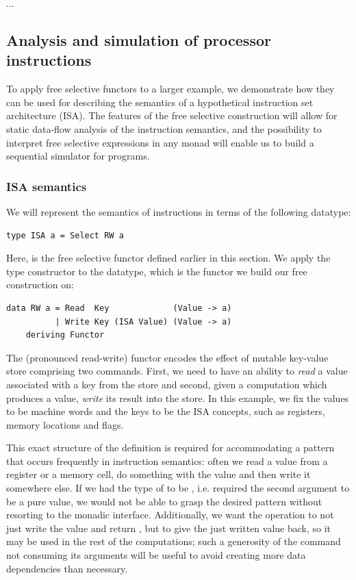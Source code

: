 ...

\subsection{Analysis and simulation of processor instructions}\label{sec-free-isa}

To apply free selective functors to a larger example, we demonstrate
how they can be used for describing the semantics of a hypothetical
instruction set architecture (ISA). The features of the free selective construction will
allow for static data-flow analysis of the instruction semantics, and the possibility
to interpret free selective expressions in any monad will enable us to build a
sequential simulator for programs.

\subsubsection{\textbf{ISA semantics}}

We will represent the semantics of instructions in terms of the following datatype:

\begin{verbatim}
type ISA a = Select RW a
\end{verbatim}

Here,  is the free selective functor defined earlier in this section.
We apply the  type constructor to the  datatype, which is the
functor we build our free construction on:

\begin{verbatim}
data RW a = Read  Key             (Value -> a)
          | Write Key (ISA Value) (Value -> a)
    deriving Functor
\end{verbatim}

The  (pronounced read-write) functor encodes the effect of mutable key-value store
comprising two commands.
First, we need to have an ability to \emph{read} a value associated with a key from the store
and second, given a computation which produces a value, \emph{write} its result into the store.
In this example, we fix the values to be machine words and the keys to be the ISA concepts, such
as registers, memory locations and flags.

This exact structure of the definition is required for accommodating a pattern that
occurs frequently in instruction semantics: often we read a value from a register or a memory
cell, do something with the value and then write it somewhere else.
If we had the type of  to be , i.e. required
the second argument to be a pure value,
we would not be able to grasp the desired pattern without resorting to the monadic interface.
Additionally, we want the 
operation to not just write the value and return \hs{()}, but to give the just written value
back, so it may be used in the rest of the computations; such a generosity of the 
command not consuming its arguments will be useful to avoid creating more data dependencies
than necessary.

